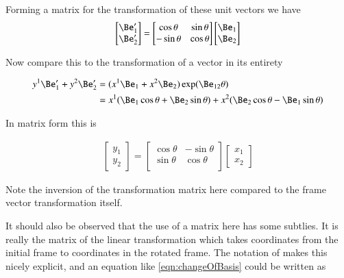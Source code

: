 \documentclass{article}
\begin{document}
Forming a matrix for the transformation of these unit vectors we have
\begin{align*}
\begin{bmatrix}
\Be_1' \\
\Be_2'
\end{bmatrix}
=
\begin{bmatrix}
\cos\theta & \sin\theta \\
- \sin\theta & \cos\theta \\
\end{bmatrix}
\begin{bmatrix}
\Be_1 \\
\Be_2
\end{bmatrix}
\end{align*}

Now compare this to the transformation of a vector in its entirety

\begin{align*}
y^1 \Be_1' + y^2 \Be_2'
&= ( x^1 \Be_1 + x^2 \Be_2 ) \exp(\Be_{12}\theta) \\
&= x^1(\Be_1 \cos\theta + \Be_2 \sin\theta) 
 + x^2(\Be_2 \cos\theta - \Be_1 \sin\theta) \\
\end{align*}

In matrix form this is

\begin{align}\label{eqn:changeOfBasis}
\begin{bmatrix}
y_1 \\
y_2
\end{bmatrix}
=
\begin{bmatrix}
\cos\theta & -\sin\theta \\
\sin\theta & \cos\theta \\
\end{bmatrix}
\begin{bmatrix}
x_1 \\
x_2
\end{bmatrix}
\end{align}

Note the inversion of the transformation matrix here compared to the frame vector transformation itself.

It should also be observed that the use of a matrix here has some subtlies.
It is really the matrix of the linear transformation which takes
coordinates from the initial frame to
coordinates in the rotated frame.  The notation of \cite{damiano1988cla}
makes this nicely explicit, and an equation like \ref{eqn:changeOfBasis}
could be written as
\end{document}
